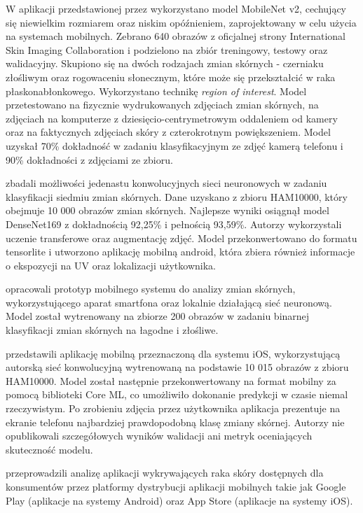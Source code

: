 W aplikacji przedstawionej przez \citet{Wirawan_2020} wykorzystano model MobileNet v2, cechujący się niewielkim rozmiarem oraz niskim opóźnieniem, zaprojektowany w celu użycia na systemach mobilnych.
Zebrano 640 obrazów z oficjalnej strony International Skin Imaging Collaboration i podzielono na zbiór treningowy, testowy oraz walidacyjny.
Skupiono się na dwóch rodzajach zmian skórnych - czerniaku złośliwym oraz rogowaceniu słonecznym, które może się przekształcić w raka płaskonabłonkowego.
Wykorzystano technikę \textit{region of interest}.
Model przetestowano na fizycznie wydrukowanych zdjęciach zmian skórnych, na zdjęciach na komputerze z dziesięcio-centrymetrowym oddaleniem od kamery oraz na faktycznych zdjęciach skóry z czterokrotnym powiększeniem.
Model uzyskał 70\% dokładność w zadaniu klasyfikacyjnym ze zdjęć kamerą telefonu i 90\% dokładności z zdjęciami ze zbioru.

\citet{Virvou_2022} zbadali możliwości jedenastu konwolucyjnych sieci neuronowych w zadaniu klasyfikacji siedmiu zmian skórnych.
Dane uzyskano z zbioru HAM10000, który obejmuje 10 000 obrazów zmian skórnych.
Najlepsze wyniki osiągnął model DenseNet169 z dokładnością 92,25\% i pełnością 93,59\%.
Autorzy wykorzystali uczenie transferowe oraz augmentację zdjęć.
Model przekonwertowano do formatu tensorlite i utworzono aplikację mobilną android, która zbiera również informacje o ekspozycji na UV oraz lokalizacji użytkownika.

\citet{Bouchachia_2013} opracowali prototyp mobilnego systemu do analizy zmian skórnych, wykorzystującego aparat smartfona oraz lokalnie działającą sieć neuronową.
Model został wytrenowany na zbiorze 200 obrazów w zadaniu binarnej klasyfikacji zmian skórnych na łagodne i złośliwe.

\citet{8795362} przedstawili aplikację mobilną przeznaczoną dla systemu iOS, wykorzystującą autorską sieć konwolucyjną wytrenowaną na podstawie 10 015 obrazów z zbioru HAM10000.
Model został następnie przekonwertowany na format mobilny za pomocą biblioteki Core ML, co umożliwiło dokonanie predykcji w czasie niemal rzeczywistym.
Po zrobieniu zdjęcia przez użytkownika aplikacja prezentuje na ekranie telefonu najbardziej prawdopodobną klasę zmiany skórnej.
Autorzy nie opublikowali szczegółowych wyników walidacji ani metryk oceniających skuteczność modelu.

\citet{Janda_2021} przeprowadzili analizę aplikacji wykrywających raka skóry dostępnych dla konsumentów przez platformy dystrybucji aplikacji mobilnych takie jak Google Play (aplikacje na systemy Android) oraz App Store (aplikacje na systemy iOS).

